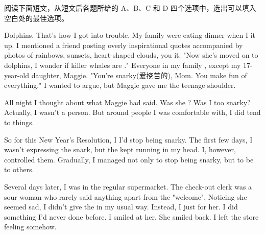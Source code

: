 \documentclass{英语试卷}
\begin{document}
\par 阅读下面短文，从短文后各题所给的 A、B、C 和 D 四个选项中，选出可以填入空白处的最佳选项。\par
\par Dolphins. That's how I got into trouble. My family were eating dinner when I  it up. I mentioned a friend posting overly inspirational quotes accompanied by photos of rainbows, sunsets, heart-shaped clouds, you  it. "Now she's moved on to dolphins, I wonder if killer whales are ." Everyone in my family , except my 17-year-old daughter, Maggie. "You're snarky(爱挖苦的), Mom. You make fun of everything." I wanted to argue, but Maggie gave me the teenage  shoulder.\par
\par All night I thought about what Maggie had said. Was she ? Was I too snarky? Actually, I wasn't a  person. But around people I was comfortable with, I did tend to  things.\par
\par So for this New Year's Resolution, I  I'd stop being snarky. The first few days, I wasn't expressing the snark, but the  kept running in my head. I, however, controlled them. Gradually, I managed not only to stop being snarky, but to be  to others.\par
\par Several days later, I was in the regular supermarket. The check-out clerk was a sour woman who rarely said anything apart from the  "welcome". Noticing she seemed sad, I didn't give the  in my usual way. Instead, I just  for her. I did something I'd never done before. I smiled at her. She smiled back. I left the store feeling  somehow.\par
{}
\end{document}
